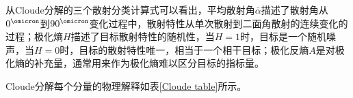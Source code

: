 \documentclass[promaster]{thesis-uestc}
\begin{document}
从Cloude分解的三个散射分类计算式可以看出，平均散射角$\bar{\alpha}$描述了散射角从$0^{\operatorname{\omicron}}$到$90^{\operatorname{\omicron}}$变化过程中，散射特性从单次散射到二面角散射的连续变化的过程；极化熵$H$描述了目标散射特性的随机性，当$H=1$时，目标是一个随机噪声，当$H=0$时，目标的散射特性唯一，相当于一个相干目标；极化反熵$A$是对极化熵的补充量，通常用来作为极化熵难以区分目标的指标量。

Cloude分解每个分量的物理解释如表\ref{Cloude table}所示。
\begin{table}[h]
    \caption{Cloude分解}
    \label{Cloude table}
\end{table}
\end{document}
